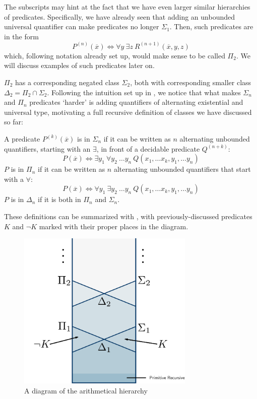 The subscripts may hint at the fact that we have even larger similar hierarchies of predicates. Specifically, we have already seen that adding an unbounded universal quantifier can make predicates no longer $\Sigma_1$. Then, such predicates are in the form \[
    P^{(n)}(\overline{x}) \iff \forall y \ \exists z \ R^{(n+1)}(\overline{x}, y, z)
\]
which, following notation already set up, would make sense to be called $\Pi_2$. We will discuss examples of such predicates later on.

$\Pi_2$ has a corresponding negated class $\Sigma_2$, both with corresponding smaller class $\Delta_2 = \Pi_2 \cap \Sigma_2$. Following the intuition set up in , we notice that what makes $\Sigma_n$ and $\Pi_n$ predicates `harder' is adding quantifiers of alternating existential and universal type, motivating a full recursive definition of classes we have discussed so far:

\begin{definition}
A predicate $P^{(k)}(\overline{x})$ is in $\Sigma_n$ if it can be written as $n$ alternating unbounded quantifiers, starting with an $\exists$, in front of a decidable predicate $Q^{(n+k)}$: \[
    P(\overline{x}) \iff \exists y_1 \ \forall y_2 \ \ldots y_n \ Q(x_1, \ldots x_k, y_1, \ldots y_n)
\]
$P$ is in $\Pi_n$ if it can be written as $n$ alternating unbounded quantifiers that start with a $\forall$:
\[
    P(\overline{x}) \iff \forall y_1 \ \exists y_2 \ \ldots y_n \ Q(x_1, \ldots x_k, y_1, \ldots y_n)
\]
$P$ is in $\Delta_n$ if it is both in $\Pi_n$ and $\Sigma_n$.
\end{definition}

These definitions can be summarized with , with previously-discussed predicates $K$ and $\lnot K$ marked with their proper places in the diagram.

\begin{figure}[H]
\centering
    \includegraphics[height=3in]{figures/arithmetical-hierarchy.png}
\caption{A diagram of the arithmetical hierarchy}
\label{hierarchy-figure}
\end{figure}

